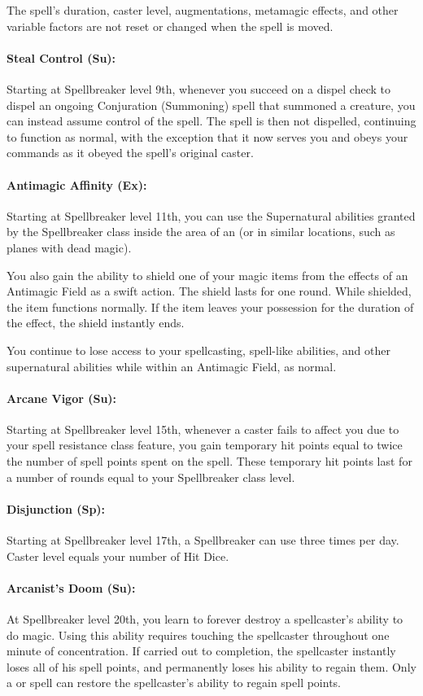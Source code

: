 The spell's duration, caster level, augmentations, metamagic effects, and other variable factors are not reset or changed when the spell is moved.
\paragraph{Steal Control (Su):} Starting at Spellbreaker level 9th, whenever you succeed on a dispel check to dispel an ongoing Conjuration (Summoning) spell that summoned a creature, you can instead assume control of the spell. The spell is then not dispelled, continuing to function as normal, with the exception that it now serves you and obeys your commands as it obeyed the spell's original caster.

\paragraph{Antimagic Affinity (Ex):} Starting at Spellbreaker level 11th, you can use the Supernatural abilities granted by the Spellbreaker class inside the area of an  (or in similar locations, such as planes with dead magic). 

You also gain the ability to shield one of your magic items from the effects of an Antimagic Field as a swift action. The shield lasts for one round. While shielded, the item functions normally. If the item leaves your possession for the duration of the effect, the shield instantly ends.

You continue to lose access to your spellcasting, spell-like abilities, and other supernatural abilities while within an Antimagic Field, as normal.
\paragraph{Arcane Vigor (Su):} Starting at Spellbreaker level 15th, whenever a caster fails to affect you due to your spell resistance class feature, you gain temporary hit points equal to twice the number of spell points spent on the spell. These temporary hit points last for a number of rounds equal to your Spellbreaker class level.

\paragraph{Disjunction (Sp):} Starting at Spellbreaker level 17th, a Spellbreaker can use  three times per day. Caster level equals your number of Hit Dice.

\paragraph{Arcanist's Doom (Su):} At Spellbreaker level 20th, you learn to forever destroy a spellcaster's ability to do magic.
Using this ability requires touching the spellcaster throughout one minute of concentration. If carried out to completion, the spellcaster instantly loses all of his spell points, and permanently loses his ability to regain them. Only a  or  spell can restore the spellcaster's ability to regain spell points.


